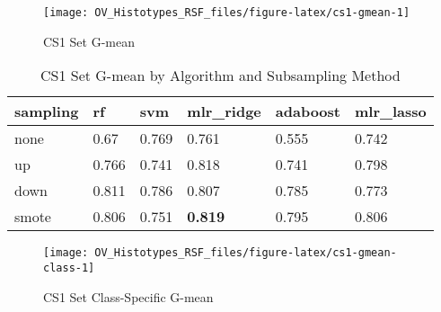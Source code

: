 \documentclass[
]{report}
\begin{document}
\begin{figure}[H]

{\centering \texttt{[image: OV\_Histotypes\_RSF\_files/figure-latex/cs1-gmean-1]} 

}

\caption{CS1 Set G-mean}\label{fig:cs1-gmean}
\end{figure}

\begin{table}

\caption{\label{tab:cs1-gmean-table}CS1 Set G-mean by Algorithm and Subsampling Method}
\centering
\begin{tabular}[t]{l|l|l|l|l|l}
\hline
sampling & rf & svm & mlr\_ridge & adaboost & mlr\_lasso\\
\hline
none & 0.67 & 0.769 & 0.761 & 0.555 & 0.742\\
\hline
up & 0.766 & 0.741 & 0.818 & 0.741 & 0.798\\
\hline
down & 0.811 & 0.786 & 0.807 & 0.785 & 0.773\\
\hline
smote & 0.806 & 0.751 & \textbf{0.819} & 0.795 & 0.806\\
\hline
\end{tabular}
\end{table}

\begin{figure}[H]

{\centering \texttt{[image: OV\_Histotypes\_RSF\_files/figure-latex/cs1-gmean-class-1]} 

}

\caption{CS1 Set Class-Specific G-mean}\label{fig:cs1-gmean-class}
\end{figure}
\end{document}
